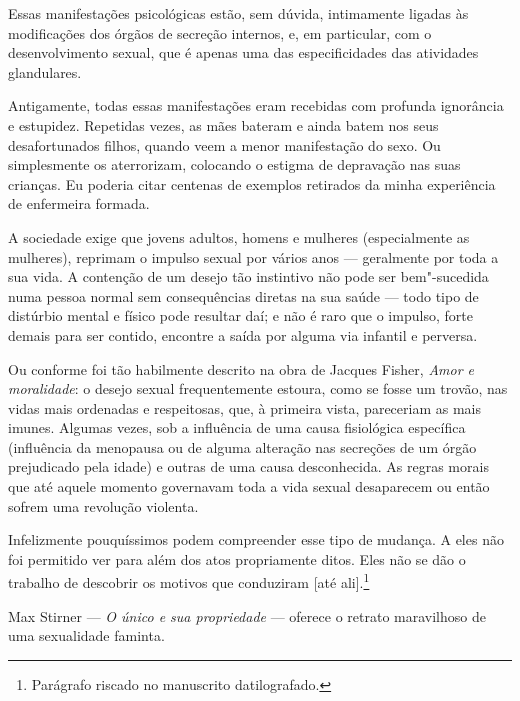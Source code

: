 Essas manifestações psicológicas estão, sem dúvida, intimamente ligadas
às modificações dos órgãos de secreção internos, e, em particular, com o
desenvolvimento sexual, que é apenas uma das especificidades das atividades
glandulares.

Antigamente, todas essas manifestações eram recebidas com profunda
ignorância e estupidez. Repetidas vezes, as mães bateram e ainda batem
nos seus desafortunados filhos, quando veem a menor manifestação do
sexo. Ou simplesmente os aterrorizam, colocando o estigma de depravação nas suas
crianças. Eu poderia citar centenas de exemplos retirados da minha
experiência de enfermeira formada.

A sociedade exige que jovens adultos, homens e mulheres (especialmente
as mulheres), reprimam o impulso sexual por vários anos --- geralmente
por toda a sua vida. A contenção de um desejo tão instintivo não pode
ser bem"-sucedida numa pessoa normal sem consequências diretas na sua
saúde --- todo tipo de distúrbio mental e físico pode resultar daí; e não
é raro que o impulso, forte demais para ser contido, encontre a saída
por alguma via infantil e perversa.


Ou conforme foi tão habilmente descrito na obra de Jacques Fisher,
\textit{Amor e moralidade}: o desejo sexual frequentemente estoura, como
se fosse um trovão, nas vidas mais ordenadas e respeitosas, que, à
primeira vista, pareceriam as mais imunes. Algumas vezes, sob a
influência de uma causa fisiológica específica (influência da menopausa
ou de alguma alteração nas secreções de um órgão prejudicado pela idade)
e outras de uma causa desconhecida. As regras morais que até aquele
momento governavam toda a vida sexual desaparecem ou então sofrem uma
revolução violenta.

Infelizmente pouquíssimos podem compreender esse tipo de mudança. A eles não foi permitido
ver para além dos atos propriamente ditos. Eles não se dão o trabalho de
descobrir os motivos que conduziram {[}até ali{]}.\footnote{Parágrafo
  riscado no manuscrito datilografado.}


Max Stirner --- \textit{O único e sua propriedade} --- oferece o retrato
maravilhoso de uma sexualidade faminta.

